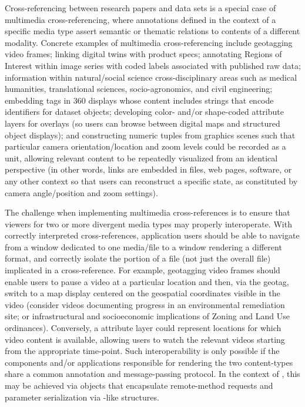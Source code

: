 \documentclass[11pt]{article}
\begin{document}
{\begin{description}
\pseudoIndent{} Cross-referencing between research papers and data sets 
is a special case of multimedia cross-referencing, where annotations defined 
in the context of a specific media type assert semantic or thematic 
relations to contents of a different modality.  Concrete examples 
of multimedia cross-referencing include geotagging video frames; linking 
\CAD{} digital twins with product specs; annotating Regions of Interest 
within image series with coded labels associated with published raw data; 
information within natural/social science cross-disciplinary areas such as medical 
humanities, translational sciences, socio-agronomics, and civil engineering;
embedding tags in 360\textdegree{} displays whose content includes 
\URL{} strings that encode identifiers for dataset objects; developing 
color- and/or shape-coded attribute layers for \GIS{} overlays (so users 
can browse between digital maps and structured object 
displays); and constructing numeric tuples from \ThreeD{} graphics scenes 
such that particular camera orientation/location and zoom levels 
could be recorded as a unit, allowing relevant \ThreeD{} content to be 
repeatedly visualized from an identical perspective (in other words, 
links are embedded in \PDF{} files, web pages, software, or any 
other context so that users can reconstruct a specific \ThreeD{} state, 
as constituted by camera angle/position and zoom settings).

\pseudoIndent{}  The challenge when implementing multimedia cross-references is to 
ensure that viewers for two or more divergent media types may properly 
interoperate.  With correctly interpreted cross-references, application users should be able 
to navigate from a window dedicated to one media/file to a 
window rendering a different format, and correctly isolate the 
portion of a file (not just the overall file) implicated in a cross-reference.  
For example, geotagging video frames should enable users to pause a video 
at a particular location and then, via the geotag, switch to a map 
display centered on the geospatial coordinates visible in the video 
(consider videos documenting progress in an environmental 
remediation site; or infrastructural and socioeconomic implications of 
Zoning and Land Use ordinances).  Conversely, a \GIS{} attribute layer could represent 
locations for which video content is available, allowing users 
to watch the relevant videos starting from the appropriate time-point.  
Such interoperability is only possible if the components and/or applications 
responsible for rendering the two content-types share a common 
annotation and message-passing protocol.  In the context of \PacTk{}, 
this may be achieved via \TSOM{}  objects that encapsulate 
remote-method requests and parameter serialization via 
\TagML{}-like structures.
 


\end{description}}
\end{document}
